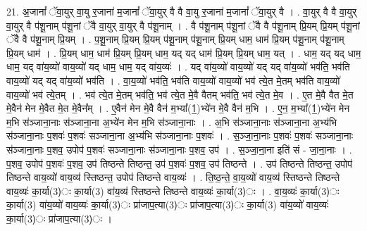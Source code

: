 \documentclass[17pt]{extarticle}
\begin{document}
21. अ॒जानां᳚ ॅवा॒युर् वा॒यु र॒जाना॑ म॒जानां᳚ ॅवा॒युर् वै वै वा॒यु र॒जाना॑ म॒जानां᳚ ॅवा॒युर् वै । . वा॒युर् वै वै वा॒युर् वा॒युर् वै प॑शू॒नाम् प॑शू॒नां ॅवै वा॒युर् वा॒युर् वै प॑शू॒नाम् । . वै प॑शू॒नाम् प॑शू॒नां ॅवै वै प॑शू॒नाम् प्रि॒यम् प्रि॒यम् प॑शू॒नां ॅवै वै प॑शू॒नाम् प्रि॒यम् । . प॒शू॒नाम् प्रि॒यम् प्रि॒यम् प॑शू॒नाम् प॑शू॒नाम् प्रि॒यम् धाम॒ धाम॑ प्रि॒यम् प॑शू॒नाम् प॑शू॒नाम् प्रि॒यम् धाम॑ । . प्रि॒यम् धाम॒ धाम॑ प्रि॒यम् प्रि॒यम् धाम॒ यद् यद् धाम॑ प्रि॒यम् प्रि॒यम् धाम॒ यत् । . धाम॒ यद् यद् धाम॒ धाम॒ यद् वा॑य॒व्यो॑ वाय॒व्यो॑ यद् धाम॒ धाम॒ यद् वा॑य॒व्यः॑ । . यद् वा॑य॒व्यो॑ वाय॒व्यो॑ यद् यद् वा॑य॒व्यो॑ भव॑ति॒ भव॑ति वाय॒व्यो॑ यद् यद् वा॑य॒व्यो॑ भव॑ति । . वा॒य॒व्यो॑ भव॑ति॒ भव॑ति वाय॒व्यो॑ वाय॒व्यो॑ भव॑ त्ये॒त मे॒तम् भव॑ति वाय॒व्यो॑ वाय॒व्यो॑ भव॑ त्ये॒तम् । . भव॑ त्ये॒त मे॒तम् भव॑ति॒ भव॑ त्ये॒त मे॒वै वैतम् भव॑ति॒ भव॑ त्ये॒त मे॒व । . ए॒त मे॒वै वैत मे॒त मे॒वैन॑ मेन मे॒वैत मे॒त मे॒वैन᳚म् । . ए॒वैन॑ मेन मे॒वै वैन॑ म॒भ्या᳚(1॒)भ्ये॑न मे॒वै वैन॑ म॒भि । . ए॒न॒ म॒भ्या᳚(1॒)भ्ये॑न मेन म॒भि स॑ञ्जाना॒नाः स॑ञ्जाना॒ना अ॒भ्ये॑न मेन म॒भि स॑ञ्जाना॒नाः । . अ॒भि स॑ञ्जाना॒नाः स॑ञ्जाना॒ना अ॒भ्य॑भि स॑ञ्जाना॒नाः प॒शवः॑ प॒शवः॑ सञ्जाना॒ना अ॒भ्य॑भि स॑ञ्जाना॒नाः प॒शवः॑ । . स॒ञ्जा॒ना॒नाः प॒शवः॑ प॒शवः॑ सञ्जाना॒नाः स॑ञ्जाना॒नाः प॒शव॒ उपोप॑ प॒शवः॑ सञ्जाना॒नाः स॑ञ्जाना॒नाः प॒शव॒ उप॑ । . स॒ञ्जा॒ना॒ना इति॑ सं - जा॒ना॒नाः । . प॒शव॒ उपोप॑ प॒शवः॑ प॒शव॒ उप॑ तिष्ठन्ते तिष्ठन्त॒ उप॑ प॒शवः॑ प॒शव॒ उप॑ तिष्ठन्ते । . उप॑ तिष्ठन्ते तिष्ठन्त॒ उपोप॑ तिष्ठन्ते वाय॒व्यो॑ वाय॒व्य॑ स्तिष्ठन्त॒ उपोप॑ तिष्ठन्ते वाय॒व्यः॑ । . ति॒ष्ठ॒न्ते॒ वा॒य॒व्यो॑ वाय॒व्य॑ स्तिष्ठन्ते तिष्ठन्ते वाय॒व्यः॑ का॒र्या(3)ः का॒र्या(3) वा॑य॒व्य॑ स्तिष्ठन्ते तिष्ठन्ते वाय॒व्यः॑ का॒र्या(3)ः । . वा॒य॒व्यः॑ का॒र्या(3)ः का॒र्या(3) वा॑य॒व्यो॑ वाय॒व्यः॑ का॒र्या(3)ः प्रा॑जाप॒त्या(3)ः प्रा॑जाप॒त्या(3)ः का॒र्या(3) वा॑य॒व्यो॑ वाय॒व्यः॑ का॒र्या(3)ः प्रा॑जाप॒त्या(3)ः । \newline
\end{document}
